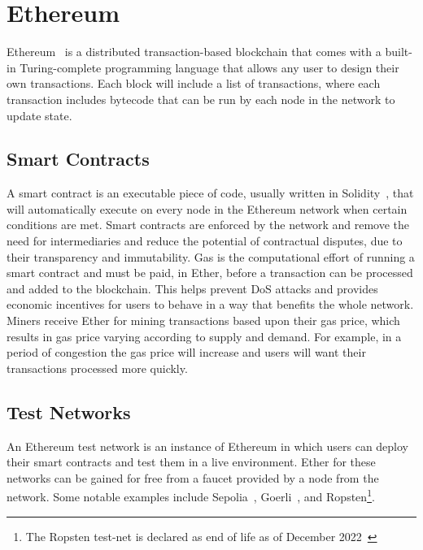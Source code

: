 
\section{Ethereum}

Ethereum~\cite{vujicic_blockchain_2018,dannen_introducing_2017} is a distributed transaction-based blockchain that comes with a built-in Turing-complete programming language that allows any user to design their own transactions. Each block will include a list of transactions, where each transaction includes bytecode that can be run by each node in the network to update state.

\subsection*{Smart Contracts}

A smart contract is an executable piece of code, usually written in Solidity~\cite{noauthor_solidity_nodate}, that will automatically execute on every node in the Ethereum network when certain conditions are met. Smart contracts are enforced by the network and remove the need for intermediaries and reduce the potential of contractual disputes, due to their transparency and immutability.
\x
Gas is the computational effort of running a smart contract and must be paid, in Ether, before a transaction can be processed and added to the blockchain. This helps prevent DoS attacks and provides economic incentives for users to behave in a way that benefits the whole network.
\x
Miners receive Ether for mining transactions based upon their gas price, which results in gas price varying according to supply and demand. For example, in a period of congestion the gas price will increase and users will want their transactions processed more quickly.

\subsection*{Test Networks}

An Ethereum test network is an instance of Ethereum in which users can deploy their smart contracts and test them in a live environment. Ether for these networks can be gained for free from a faucet provided by a node from the network. Some notable examples include Sepolia~\cite{noauthor_sepolia_nodate}, Goerli~\cite{noauthor_goerli_nodate}, and Ropsten\footnote{The Ropsten test-net is declared as end of life as of December 2022~\cite{noauthor_ropsten_2023}}.
